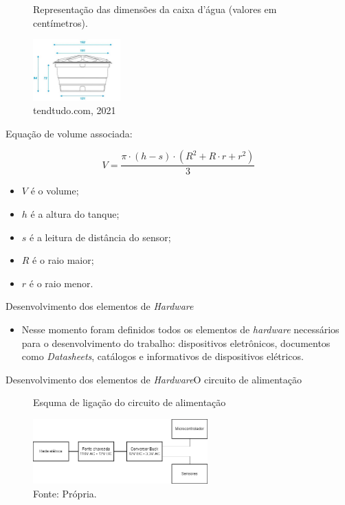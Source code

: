 \begin{frame}{}
  \vspace*{-0.1cm}
  \begin{figure}[H]
    \centering
    \caption{Representação das dimensões da caixa d'água (valores em centímetros).}
    \includegraphics[width=0.3\textwidth]{figuras/caixa.jpg}
    \caption*{\tiny{tendtudo.com, 2021}}
    \label{fig:volume_tanque}
  \end{figure}
  
  Equação de volume associada:
  
  \begin{equation}
  V = \frac{\pi\cdot (h-s)\cdot (R^{2}+R\cdot r+r^{2})}{3} 
  \end{equation}
  
  \begin{itemize}
    \item $V$ é o volume;
    \item $h$ é a altura do tanque;
    \item $s$ é a leitura de distância do sensor;
    \item $R$ é o raio maior;
    \item $r$ é o raio menor.
  \end{itemize}
\end{frame}

\begin{frame}{Desenvolvimento dos elementos de \textit{Hardware}}
  \begin{itemize}
    \item Nesse momento foram definidos todos os elementos de \textit{hardware} necessários para o desenvolvimento do trabalho: dispositivos eletrônicos, documentos como \textit{Datasheets}, catálogos e informativos de dispositivos elétricos.
  \end{itemize}
  
\end{frame}

\begin{frame}{Desenvolvimento dos elementos de \textit{Hardware}}{O circuito de alimentação}
  \begin{figure}[H]
    \centering
    \caption{Esquma de ligação do circuito de alimentação}
    \includegraphics[width=0.6\textwidth]{figuras/alimentacao.png}
    \caption*{\tiny{Fonte: Própria.}}
    \label{fig:alimentacao_esquema}
  \end{figure}
\end{frame}



